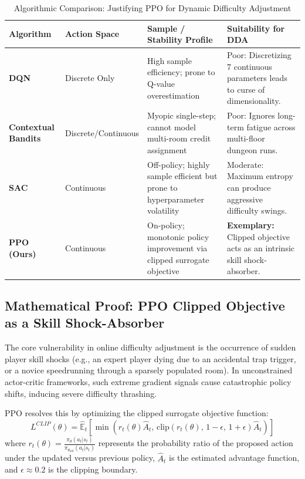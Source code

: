 \begin{table}[!htbp]
\centering
\caption{Algorithmic Comparison: Justifying PPO for Dynamic Difficulty Adjustment}
\label{tab:rl_comparison}
\small
\begin{tabular}{p{}p{}p{}p{}}
\toprule
\textbf{Algorithm} & \textbf{Action Space} & \textbf{Sample / Stability Profile} & \textbf{Suitability for DDA} \\
\midrule
\textbf{DQN}~\cite{mnih2015human} & Discrete Only & High sample efficiency; prone to Q-value overestimation & Poor: Discretizing 7 continuous parameters leads to curse of dimensionality. \\
\textbf{Contextual Bandits} & Discrete/Continuous & Myopic single-step; cannot model multi-room credit assignment & Poor: Ignores long-term fatigue across multi-floor dungeon runs. \\
\textbf{SAC}~\cite{haarnoja2018soft} & Continuous & Off-policy; highly sample efficient but prone to hyperparameter volatility & Moderate: Maximum entropy can produce aggressive difficulty swings. \\
\textbf{PPO (Ours)}~\cite{schulman2017proximal} & Continuous & On-policy; monotonic policy improvement via clipped surrogate objective & \textbf{Exemplary:} Clipped objective acts as an intrinsic skill shock-absorber. \\
\bottomrule
\end{tabular}
\end{table}

\subsection{Mathematical Proof: PPO Clipped Objective as a Skill Shock-Absorber}\label{sec:ppo_proof}
The core vulnerability in online difficulty adjustment is the occurrence of sudden player skill shocks (e.g., an expert player dying due to an accidental trap trigger, or a novice speedrunning through a sparsely populated room). In unconstrained actor-critic frameworks, such extreme gradient signals cause catastrophic policy shifts, inducing severe difficulty thrashing.

PPO resolves this by optimizing the clipped surrogate objective function:
\begin{equation}
L^{CLIP}(\theta) = \hat{\mathbb{E}}_t \left[ \min\left(r_t(\theta)\hat{A}_t, \, \text{clip}\left(r_t(\theta), \, 1-\epsilon, \, 1+\epsilon\right)\hat{A}_t\right) \right]
\label{eq:ppo_clip}
\end{equation}
where $r_t(\theta) = \frac{\pi_\theta(a_t | s_t)}{\pi_{\theta_{old}}(a_t | s_t)}$ represents the probability ratio of the proposed action under the updated versus previous policy, $\hat{A}_t$ is the estimated advantage function, and $\epsilon \approx 0.2$ is the clipping boundary.

